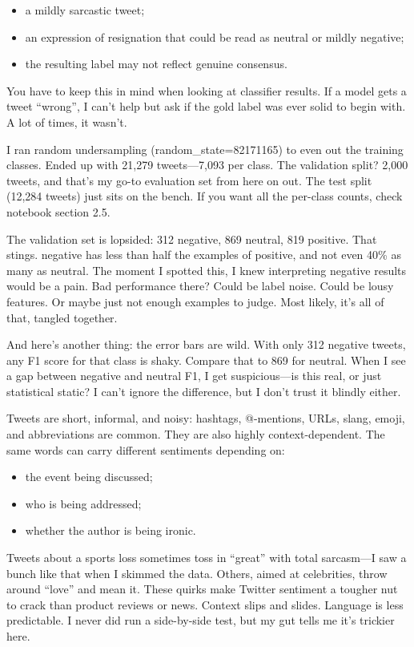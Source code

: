 \documentclass[12pt]{article}
\begin{document}
\begin{itemize}

  \item a mildly sarcastic tweet;

  \item an expression of resignation that could be read as neutral or mildly negative;

  \item the resulting label may not reflect genuine consensus.

\end{itemize}

You have to keep this in mind when looking at classifier results. If a model gets a tweet ``wrong'', I can't help but ask if the gold label was ever solid to begin with. A lot of times, it wasn't.

I ran random undersampling (random\_state=82171165) to even out the training classes. Ended up with 21,279 tweets---7,093 per class. The validation split? 2,000 tweets, and that's my go-to evaluation set from here on out. The test split (12,284 tweets) just sits on the bench. If you want all the per-class counts, check notebook section 2.5.

The validation set is lopsided: 312 negative, 869 neutral, 819 positive. That stings. negative has less than half the examples of positive, and not even 40\% as many as neutral. The moment I spotted this, I knew interpreting negative results would be a pain. Bad performance there? Could be label noise. Could be lousy features. Or maybe just not enough examples to judge. Most likely, it's all of that, tangled together.

And here's another thing: the error bars are wild. With only 312 negative tweets, any F1 score for that class is shaky. Compare that to 869 for neutral. When I see a gap between negative and neutral F1, I get suspicious---is this real, or just statistical static? I can't ignore the difference, but I don't trust it blindly either.

Tweets are short, informal, and noisy: hashtags, @-mentions, URLs, slang, emoji, and abbreviations are common. They are also highly context-dependent. The same words can carry different sentiments depending on:

\begin{itemize}

  \item the event being discussed;

  \item who is being addressed;

  \item whether the author is being ironic.

\end{itemize} Tweets about a sports loss sometimes toss in ``great'' with total sarcasm---I saw a bunch like that when I skimmed the data. Others, aimed at celebrities, throw around ``love'' and mean it. These quirks make Twitter sentiment a tougher nut to crack than product reviews or news. Context slips and slides. Language is less predictable. I never did run a side-by-side test, but my gut tells me it's trickier here.
\end{document}
